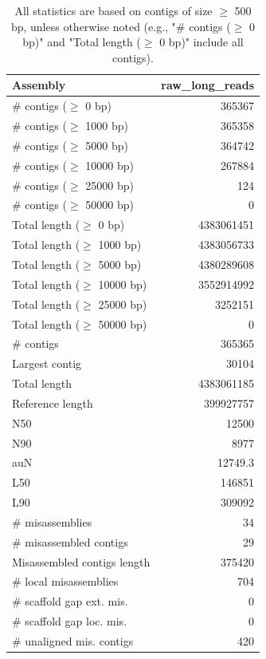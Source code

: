 \documentclass[12pt,a4paper]{article}
\begin{document}
\begin{table}[ht]
\begin{center}
\caption{All statistics are based on contigs of size $\geq$ 500 bp, unless otherwise noted (e.g., "\# contigs ($\geq$ 0 bp)" and "Total length ($\geq$ 0 bp)" include all contigs).}
\begin{tabular}{|l*{1}{|r}|}
\hline
Assembly & raw\_long\_reads \\ \hline
\# contigs ($\geq$ 0 bp) & 365367 \\ \hline
\# contigs ($\geq$ 1000 bp) & 365358 \\ \hline
\# contigs ($\geq$ 5000 bp) & 364742 \\ \hline
\# contigs ($\geq$ 10000 bp) & 267884 \\ \hline
\# contigs ($\geq$ 25000 bp) & 124 \\ \hline
\# contigs ($\geq$ 50000 bp) & 0 \\ \hline
Total length ($\geq$ 0 bp) & 4383061451 \\ \hline
Total length ($\geq$ 1000 bp) & 4383056733 \\ \hline
Total length ($\geq$ 5000 bp) & 4380289608 \\ \hline
Total length ($\geq$ 10000 bp) & 3552914992 \\ \hline
Total length ($\geq$ 25000 bp) & 3252151 \\ \hline
Total length ($\geq$ 50000 bp) & 0 \\ \hline
\# contigs & 365365 \\ \hline
Largest contig & 30104 \\ \hline
Total length & 4383061185 \\ \hline
Reference length & 399927757 \\ \hline
N50 & 12500 \\ \hline
N90 & 8977 \\ \hline
auN & 12749.3 \\ \hline
L50 & 146851 \\ \hline
L90 & 309092 \\ \hline
\# misassemblies & 34 \\ \hline
\# misassembled contigs & 29 \\ \hline
Misassembled contigs length & 375420 \\ \hline
\# local misassemblies & 704 \\ \hline
\# scaffold gap ext. mis. & 0 \\ \hline
\# scaffold gap loc. mis. & 0 \\ \hline
\# unaligned mis. contigs & 420 \\ \hline

\end{tabular}
\end{center}
\end{table}
\end{document}
